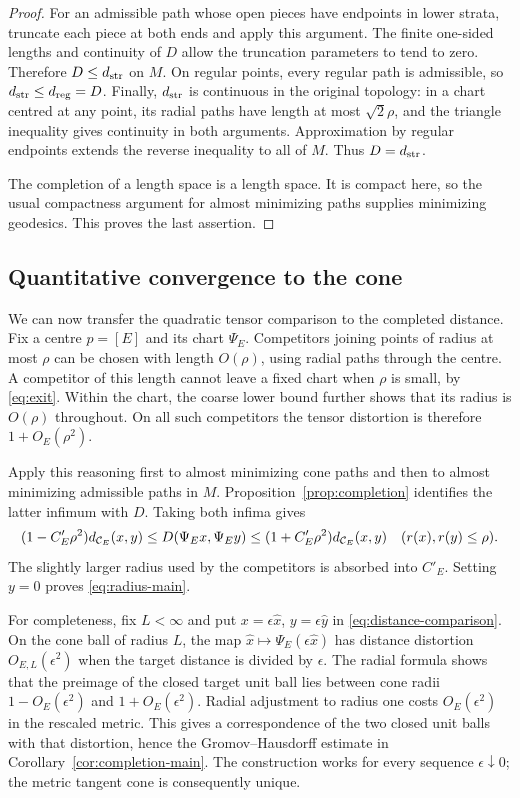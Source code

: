 \begin{proof}
For an admissible path whose open pieces have endpoints
in lower strata, truncate each piece at both ends and
apply this argument. The finite one-sided lengths and
continuity of $D$ allow the truncation parameters to
tend to zero. Therefore $D\le d_{\mathrm{str}}$ on $M$.
On regular points, every regular path is admissible, so
$d_{\mathrm{str}}\le d_{\mathrm{reg}}=D$. Finally, $d_{\mathrm{str}}$ is
continuous in the original topology: in a chart centred
at any point, its radial paths have length at most
$\sqrt2\rho$, and the triangle inequality gives
continuity in both arguments. Approximation by regular
endpoints extends the reverse inequality to all of $M$.
Thus $D=d_{\mathrm{str}}$.

The completion of a length space is a length space.
It is compact here, so the usual compactness argument
for almost minimizing paths supplies minimizing
geodesics. This proves the last assertion.
\end{proof}

\subsection{Quantitative convergence to the cone}
We can now transfer the quadratic tensor comparison to
the completed distance. Fix a centre $p=[E]$ and its
chart $\Psi_E$. Competitors joining points of radius
at most $\rho$ can be chosen with length $O(\rho)$,
using radial paths through the centre. A competitor
of this length cannot leave a fixed chart when $\rho$
is small, by \eqref{eq:exit}. Within the chart, the
coarse lower bound further shows that its radius is
$O(\rho)$ throughout. On all such competitors the
tensor distortion is therefore $1+O_E(\rho^2)$.

Apply this reasoning first to almost minimizing cone
paths and then to almost minimizing admissible paths
in $M$. Proposition~\ref{prop:completion} identifies
the latter infimum with $D$. Taking both infima gives
\begin{equation}\label{eq:distance-comparison}
 (1-C'_E\rho^2)d_{\mathcal C_E}(x,y)
 \le D(\Psi_E x,\Psi_E y)
 \le(1+C'_E\rho^2)d_{\mathcal C_E}(x,y)
 \quad(r(x),r(y)\le\rho).
\end{equation}
The slightly larger radius used by the competitors
is absorbed into $C'_E$. Setting $y=0$ proves
\eqref{eq:radius-main}.

For completeness, fix $L<\infty$ and put
$x=\epsilon\hat x$, $y=\epsilon\hat y$ in
\eqref{eq:distance-comparison}. On the cone ball of
radius $L$, the map
$\hat x\mapsto\Psi_E(\epsilon\hat x)$ has distance
distortion $O_{E,L}(\epsilon^2)$ when the target
distance is divided by $\epsilon$. The radial formula
shows that the preimage of the closed target unit
ball lies between cone radii $1-O_E(\epsilon^2)$
and $1+O_E(\epsilon^2)$. Radial adjustment to radius
one costs $O_E(\epsilon^2)$ in the rescaled metric.
This gives a correspondence of the two closed unit
balls with that distortion, hence the
Gromov--Hausdorff estimate in
Corollary~\ref{cor:completion-main}. The construction
works for every sequence $\epsilon\downarrow0$;
the metric tangent cone is consequently unique.
